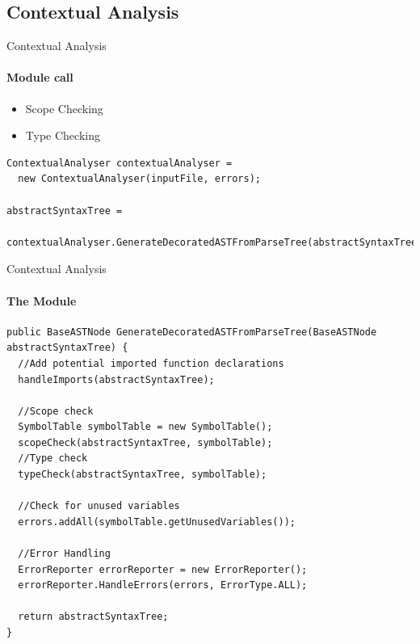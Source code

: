 \subsection{Contextual Analysis}
\begin{frame}[fragile,t]{Contextual Analysis}
\framesubtitle{Module call}
\begin{itemize}
  \item Scope Checking
  \item Type Checking
\end{itemize}
\begin{lstlisting}[caption=The creation of an instance of the Contextual analysis module and the call invoking it. ,frame=tlrb, basicstyle=\tiny, numbers=none]
ContextualAnalyser contextualAnalyser = 
  new ContextualAnalyser(inputFile, errors);

abstractSyntaxTree = 
  contextualAnalyser.GenerateDecoratedASTFromParseTree(abstractSyntaxTree);
\end{lstlisting}


\end{frame}
\begin{frame}[fragile,t]{Contextual Analysis}

\framesubtitle{The Module}

\begin{lstlisting}[caption=The method called from main performing Scope and Type checking and also reporting errors. ,frame=tlrb, basicstyle=\tiny, numbers=none ]
public BaseASTNode GenerateDecoratedASTFromParseTree(BaseASTNode abstractSyntaxTree) {
  //Add potential imported function declarations
  handleImports(abstractSyntaxTree);

  //Scope check
  SymbolTable symbolTable = new SymbolTable();
  scopeCheck(abstractSyntaxTree, symbolTable);
  //Type check
  typeCheck(abstractSyntaxTree, symbolTable);

  //Check for unused variables
  errors.addAll(symbolTable.getUnusedVariables());

  //Error Handling
  ErrorReporter errorReporter = new ErrorReporter();
  errorReporter.HandleErrors(errors, ErrorType.ALL);

  return abstractSyntaxTree;
}
\end{lstlisting}
\end{frame}

